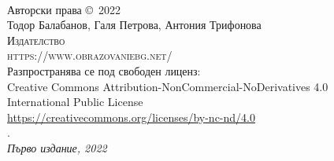 ~\vfill
\thispagestyle{empty}

\noindent Авторски права \copyright\ 2022 \\

\noindent Тодор Балабанов, Галя Петрова, Антония Трифонова \\ 

\noindent \textsc{Издателство } \\
\noindent \textsc{https://www.obrazovaniebg.net/} \\

\noindent Разпространява се под свободен лиценз: \\ 
Creative Commons Attribution-NonCommercial-NoDerivatives 4.0 \\
International Public License \\
\url{https://creativecommons.org/licenses/by-nc-nd/4.0} \\

. \\

\noindent \textit{Първо издание, 2022}